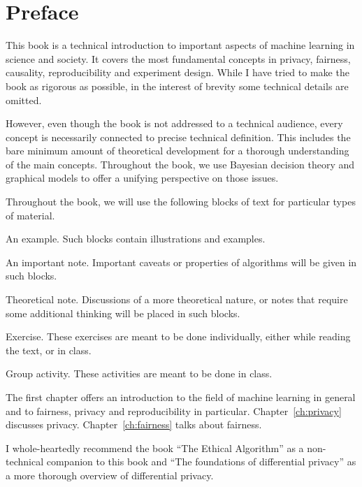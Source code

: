 \chapter*{Preface}

This book is a technical introduction to important aspects of machine learning in science and society. It covers the most fundamental concepts in privacy, fairness, causality, reproducibility and experiment design. While I have tried to make the book as rigorous as possible, in the interest of brevity some technical details are omitted. 

However, even though the book is not addressed to a technical audience, every concept is necessarily connected to precise technical definition. This includes the bare minimum amount of theoretical development for a thorough understanding of the main concepts. Throughout the book, we use Bayesian decision theory and graphical models to offer a unifying perspective on those issues.


Throughout the book, we will use the following blocks of text for particular types of material.
\begin{exampleblock}{An example.}
Such blocks contain illustrations and examples. 
\end{exampleblock}

\begin{alertblock}{An important note.}
Important caveats or properties of algorithms will be given in such blocks.
\end{alertblock}

\begin{theoryblock}{Theoretical note.}
Discussions of a more theoretical nature, or notes that require some additional thinking will be placed in such blocks.
\end{theoryblock}

\begin{exerciseblock}{Exercise.}
  These exercises are meant to be done individually, either while reading the text, or in class.
\end{exerciseblock}

\begin{groupactivity}{Group activity.}
  These activities are meant to be done in class.
\end{groupactivity}

The first chapter offers an introduction to the field of machine learning in general and to fairness, privacy and reproducibility in particular. Chapter~\ref{ch:privacy} discusses privacy. Chapter~\ref{ch:fairness} talks about fairness.

I whole-heartedly recommend the book ``The Ethical Algorithm'' as a non-technical companion to this book and ``The foundations of differential privacy'' as a more thorough overview of differential privacy.


